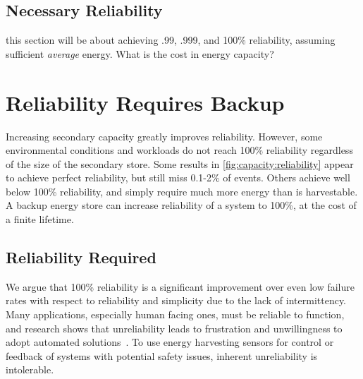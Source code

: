 \subsection{Necessary Reliability}
this section will be about achieving .99, .999, and 100\% reliability, assuming sufficient \textit{average} energy. What is the cost in energy capacity?

\section{Reliability Requires Backup}
\label{sec:primary}

Increasing secondary capacity greatly improves
reliability.
However, some environmental
conditions and workloads do not reach 100\% reliability regardless of the size
of the secondary store.
Some results in \cref{fig:capacity:reliability}
appear to achieve perfect reliability, but still miss 0.1-2\% of events.
Others achieve well below 100\% reliability, %
and simply require much more energy
than is harvestable. A backup energy store can increase reliability of a system
to 100\%, at the cost of a finite lifetime.

\subsection{Reliability Required}
\label{sec:primary:reliability}

We argue that 100\% reliability is a significant improvement over
even low failure rates with respect to reliability
and simplicity due to the lack of intermittency.
Many applications, especially human facing ones,
must be reliable to function, and research shows that unreliability
leads to frustration and %
unwillingness to adopt automated solutions~\cite{brushHome11, edwardsHome01, shehanHome07}.
To use energy harvesting sensors for control or feedback of systems with potential
safety issues, inherent unreliability is intolerable.

